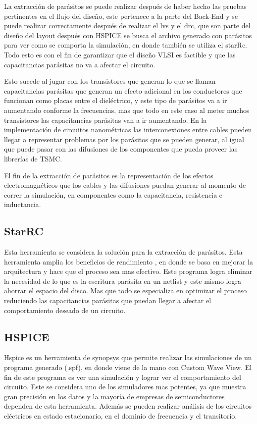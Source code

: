 La extracción de parásitos se puede realizar después de haber hecho las pruebas pertinentes en el flujo del diseño, este pertenece a la parte del Back-End y se puede realizar correctamente después de realizar el lvs y el drc, que son parte del diseño del layout después con HSPICE se busca el archivo generado con parásitos para ver como se comporta la simulación, en donde también se utiliza el starRc. Todo esto es con el fin de garantizar que el diseño VLSI es factible y que las capacitancias parásitas no va a afectar el circuito.

Esto sucede al jugar con los transistores que generan lo que se llaman capacitancias parásitas que generan un efecto adicional en los conductores que funcionan como placas entre el dieléctrico, y este tipo de parásitos va a ir aumentando conforme la frecuencias, mas que todo en este caso al meter muchos transistores las capacitancias parásitas van a ir aumentando.  En la implementación de circuitos nanométricas las interconexiones entre cables pueden llegar a representar problemas por los parásitos que se pueden generar, al igual que puede pasar con las difusiones de los componentes que pueda proveer las librerías de TSMC.

El fin de la extracción de parásitos es la representación  de los efectos electromagnéticos que los cables y las difusiones puedan generar al momento de correr la simulación, en componentes como la capacitancia, resistencia e inductancia.
 \cite{charls} 

  \subsection*{StarRC}

Esta herramienta se considera la solución para la extracción de parásitos. Esta herramienta amplia los beneficios de rendimiento , en donde se basa en mejorar la arquitectura y hace que el proceso sea mas efectivo. Este programa logra eliminar la necesidad de lo que es la escritura parásita en un netlist y este mismo logra ahorrar el espacio del disco. Mas que todo se especializa en optimizar el proceso reduciendo las capacitancias parásitas que puedan llegar a afectar el comportamiento deseado de un circuito.

 \cite{StarRc} 


\subsection*{HSPICE}

Hspice es un herramienta de synopsys que permite realizar las simulaciones de un programa generado (.spf), en donde viene de la mano con Custom Wave View. El fin de este programa es ver una simulación y lograr ver el comportamiento del circuito. 
Este se considera uno de los simuladores mas potentes, ya que muestra gran precisión en los datos y la mayoría de empresas de semiconductores dependen de esta herramienta.
Además se pueden realizar análisis de los circuitos eléctricos en estado estacionario, en el dominio de frecuencia y el transitorio.


 \cite{charls} 

